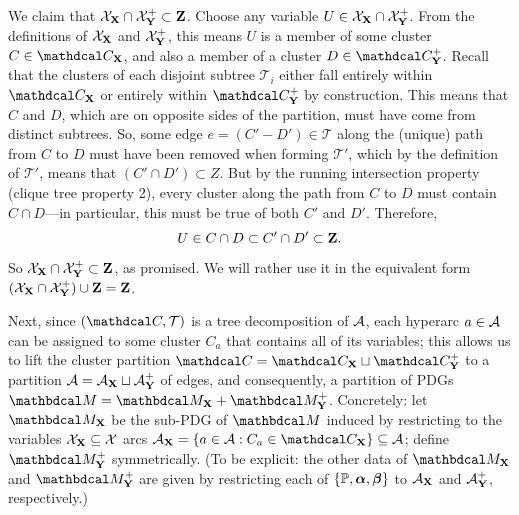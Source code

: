 \begin{lproof}
     
    We claim that $\mathcal X_{\mathbf{X}} \cap \mathcal X_{\mathbf{Y}}^+ \subset \mathbf{Z}$. 
    Choose any variable $U \in \mathcal X_{\mathbf{X}} \cap \mathcal X_{\mathbf{Y}}^+$. 
    From the definitions of $\mathcal X_{\mathbf{X}}$ and $\mathcal X_{\mathbf{Y}}^+$, this means $U$ is a member of some cluster $C \in \CX$, and also a member of a cluster $D \in \CNX$.
    Recall that the clusters of each disjoint subtree $\mathcal T_i$ either fall entirely within $\CX$ or entirely within $\CNX$ by construction.
    This means that $C$ and $D$, which are on opposite sides of the partition, must have come from distinct subtrees.
    So, some edge $e = (C'{-}D') \in \mathcal T$ along the (unique) path from $C$ to $D$ must have been removed when forming $\mathcal T'$, which by the definition of $\mathcal T'$, means that $(C' \cap D') \subset Z$. 
    But by the running intersection property (clique tree property 2), every cluster along the path from $C$ to $D$ must contain $C \cap D$---in particular, this must be true of both $C'$ and $D'$.
    Therefore,
    \[
        U \in C \cap D \subset C' \cap D' \subset \mathbf{Z}.
    \]
    So $\mathcal X_{\mathbf{X}} \cap \mathcal X_{\mathbf{Y}}^+ \subset \mathbf{Z}$, as promised.  We will rather use it in the equivalent form $(\mathcal X_{\mathbf{X}} \cap \mathcal X_{\mathbf{Y}}^+) \cup \mathbf{Z} = \mathbf{Z}$. 
    
    Next, since $(\C, \cal T)$ is a tree decomposition of $\mathcal A$, each hyperarc $a \in \mathcal A$ can be assigned to some cluster $C_a$ that contains all of its variables; this allows us to lift the cluster partition $\C = \CX \sqcup \CNX$ to a partition $\mathcal A = \mathcal A_{\mathbf{X}} \sqcup \mathcal A_{\mathbf{Y}}^+$ of edges, and consequently, a partition of PDGs $\dg M = \dg M_{\mat X} \bundle \dg M_{\mat Y}^+$.
    Concretely: let $\dg M_{\mat X}$ be the sub-PDG of $\dg M$ induced by restricting to the variables $\mathcal X_{\mathbf{X}} \subseteq \mathcal X$ arcs $\Ar_{\mat X} = \{ a \in \Ar : C_a \in \CX \} \subseteq \Ar$; define $\dg M_{\mat Y}^+$ symmetrically. (To be explicit: the other data of $\dg M_{\mat X}$ and $\dg M_{\mat Y}^+$ are given by restricting each of $\{\mathbb P,\boldsymbol\alpha,\boldsymbol\beta\}$ to $\mathcal A_{\mathbf{X}}$ and $\mathcal A_{\mathbf{Y}}^+$, respectively.)


\end{lproof}
